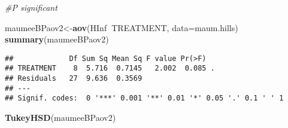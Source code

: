 \documentclass[]{article}
\newenvironment{Shaded}{\begin{snugshade}}{\end{snugshade}}
\newcommand{\KeywordTok}[1]{\textcolor[rgb]{0.13,0.29,0.53}{\textbf{#1}}}
\newcommand{\DataTypeTok}[1]{\textcolor[rgb]{0.13,0.29,0.53}{#1}}
\newcommand{\CommentTok}[1]{\textcolor[rgb]{0.56,0.35,0.01}{\textit{#1}}}
\newcommand{\OperatorTok}[1]{\textcolor[rgb]{0.81,0.36,0.00}{\textbf{#1}}}
\newcommand{\NormalTok}[1]{#1}
\begin{document}
\begin{Shaded}
\begin{Highlighting}[]
\CommentTok{#P significant}

\NormalTok{maumeeBPaov2<-}\KeywordTok{aov}\NormalTok{(HInf}\OperatorTok{~}\NormalTok{TREATMENT, }\DataTypeTok{data=}\NormalTok{maum.hills)}
\KeywordTok{summary}\NormalTok{(maumeeBPaov2)}
\end{Highlighting}
\end{Shaded}

\begin{verbatim}
##             Df Sum Sq Mean Sq F value Pr(>F)  
## TREATMENT    8  5.716  0.7145   2.002  0.085 .
## Residuals   27  9.636  0.3569                 
## ---
## Signif. codes:  0 '***' 0.001 '**' 0.01 '*' 0.05 '.' 0.1 ' ' 1
\end{verbatim}

\begin{Shaded}
\begin{Highlighting}[]
\KeywordTok{TukeyHSD}\NormalTok{(maumeeBPaov2)}
\end{Highlighting}
\end{Shaded}
\end{document}
